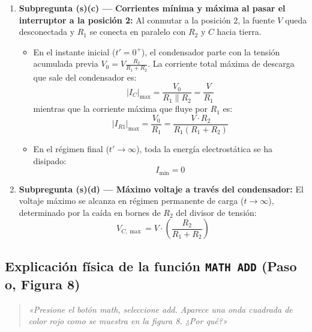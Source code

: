\begin{appendices}
\begin{enumerate}
    \item \textbf{Subpregunta (s)(c) --- Corrientes mínima y máxima al pasar el interruptor a la posición 2:}
    Al conmutar a la posición 2, la fuente $V$ queda desconectada y $R_1$ se conecta en paralelo con $R_2$ y $C$ hacia tierra.
    \begin{itemize}
        \item En el instante inicial ($t' = 0^+$), el condensador parte con la tensión acumulada previa $V_0 = V \frac{R_2}{R_1 + R_2}$. La corriente total máxima de descarga que sale del condensador es:
        \begin{equation}
            \boxed{|I_C|_{\max} = \frac{V_0}{R_1 \parallel R_2} = \frac{V}{R_1}}
        \end{equation}
        mientras que la corriente máxima que fluye por $R_1$ es:
        \begin{equation}
            \boxed{|I_{R1}|_{\max} = \frac{V_0}{R_1} = \frac{V \cdot R_2}{R_1(R_1 + R_2)}}
        \end{equation}
        \item En el régimen final ($t' \to \infty$), toda la energía electrostática se ha disipado:
        \begin{equation}
            \boxed{I_{\min} = 0}
        \end{equation}
    \end{itemize}
    
    \item \textbf{Subpregunta (s)(d) --- Máximo voltaje a través del condensador:}
    El voltaje máximo se alcanza en régimen permanente de carga ($t \to \infty$), determinado por la caída en bornes de $R_2$ del divisor de tensión:
    \begin{equation}
        \boxed{V_{C,\max} = V \cdot \left( \frac{R_2}{R_1 + R_2} \right)}
    \end{equation}
\end{enumerate}

\subsection{Explicación física de la función \texttt{MATH ADD} (Paso o, Figura 8)}
\begin{quote}
    \textit{«Presione el botón math, seleccione add. Aparece una onda cuadrada de color rojo como se muestra en la figura 8. ¿Por qué?»}
\end{quote}


\end{appendices}
